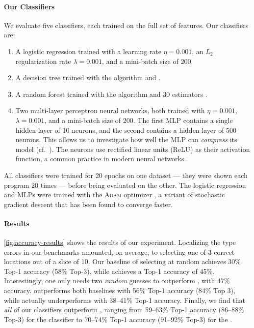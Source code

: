 \paragraph{Our Classifiers}
We evaluate five classifiers, each trained on the full set of features.
%
%
Our classifiers are:
%
\begin{enumerate}
\item A logistic regression trained with a learning rate
  $\eta = 0.001$, an $L_2$ regularization rate $\lambda = 0.001$, and a
  mini-batch size of 200.
\item A decision tree trained with the  algorithm and .
\item A random forest trained with the  algorithm and 30 estimators .
\item Two multi-layer perceptron neural networks, both trained with $\eta = 0.001$,
  $\lambda = 0.001$, and a mini-batch size of 200. The first MLP
  contains a single hidden layer of 10 neurons, and the second contains
  a hidden layer of 500 neurons. This allows us to investigate how well
  the MLP can \emph{compress} its model (cf.~\cite{FIXME}). The neurons
  use rectified linear units (ReLU) as their activation function, a
  common practice in modern neural networks.
\end{enumerate}
%
All classifiers were trained for 20 epochs on one dataset
--- \ie they were shown each program 20 times ---
before being evaluated on the other.
%
The logistic regression and MLPs were trained with the \textsc{Adam}
optimizer \citep{Kingma2014-ng}, a variant of stochastic gradient
descent that has been found to converge faster.



\paragraph{Results}
\autoref{fig:accuracy-results} shows the results of our experiment.
%
Localizing the type errors in our benchmarks amounted, on average, to
selecting one of 3 correct locations out of a slice of 10.
%
Our baseline of selecting at random achieves 30\% Top-1
accuracy (58\% Top-3), while \ocaml achieves a Top-1 accuracy of 45\%.
%
Interestingly, one only needs two \emph{random} guesses to outperform
\ocaml, with 47\% accuracy.
%
\sherrloc outperforms both baselines with 56\% Top-1 accuracy (84\% Top
3), while \mycroft actually underperforms \ocaml with 38--41\% Top-1
accuracy.
%
Finally, we find that \emph{all} of our classifiers outperform \sherrloc,
ranging from 59--63\% Top-1 accuracy (86--88\% Top-3) for the \linear
classifier to 70--74\% Top-1 accuracy (91--92\% Top-3) for the \hiddenFH.

